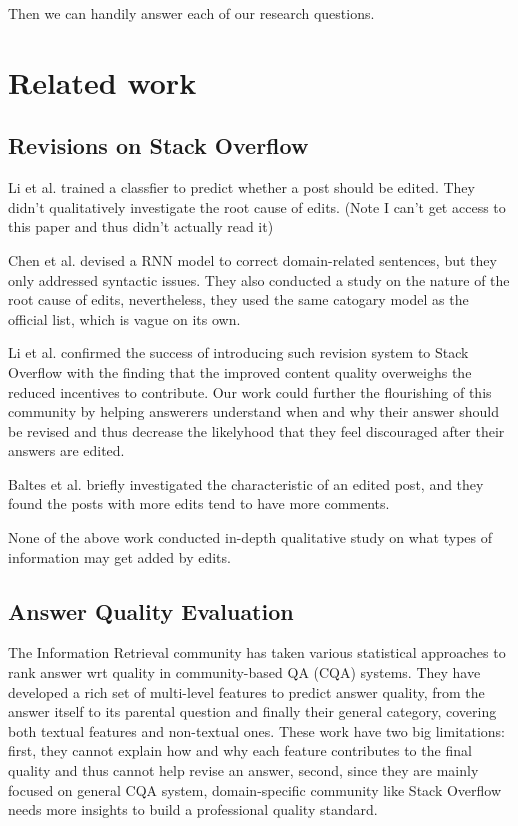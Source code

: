 \documentclass[10pt,conference]{IEEEtran}
\begin{document}
Then we can handily answer each of our research questions.

\section {Related work}
\subsection {Revisions on Stack Overflow}

Li et al. \cite{JIT1397} trained a classfier to predict whether a post should be edited. They didn't qualitatively investigate the root cause of edits. (Note I can't get access to this paper and thus didn't actually read it)

Chen et al. \cite{Chen:2017:CCD:3171581.3134667} devised a RNN model to correct domain-related sentences, but they only addressed syntactic issues. They also conducted a study on the nature of the root cause of edits, nevertheless, they used the same catogary model as the official list, which is vague on its own.

Li et al. \cite{7208aa781175403f9c3aaddc19f3b8cf} confirmed the success of introducing such revision system to Stack Overflow with the finding that the improved content quality overweighs the reduced incentives to contribute. Our work could further the flourishing of this community by helping answerers understand when and why their answer should be revised and thus decrease the likelyhood that they feel discouraged after their answers are edited. 

Baltes et al. \cite{DBLP:journals/corr/abs-1803-07311} briefly investigated the characteristic of an edited post, and they found the posts with more edits tend to have more comments.  

None of the above work conducted in-depth qualitative study on what types of information may get added by edits. 

\subsection {Answer Quality Evaluation}

The Information Retrieval community has taken various statistical approaches to rank answer wrt quality in community-based QA (CQA) systems. \cite{DBLP:journals/corr/SugguGCS16, Dalip:2013:EUF:2484028.2484072, Shah:2010:EPA:1835449.1835518, 7857066} They have developed a rich set of multi-level features to predict answer quality, from the answer itself to its parental question and finally their general category, covering both textual features and non-textual ones. These work have two big limitations: first, they cannot explain how and why each feature contributes to the final quality and thus cannot help revise an answer, second, since they are mainly focused on general CQA system, domain-specific community like Stack Overflow needs more insights to build a professional quality standard.    
\end{document}
